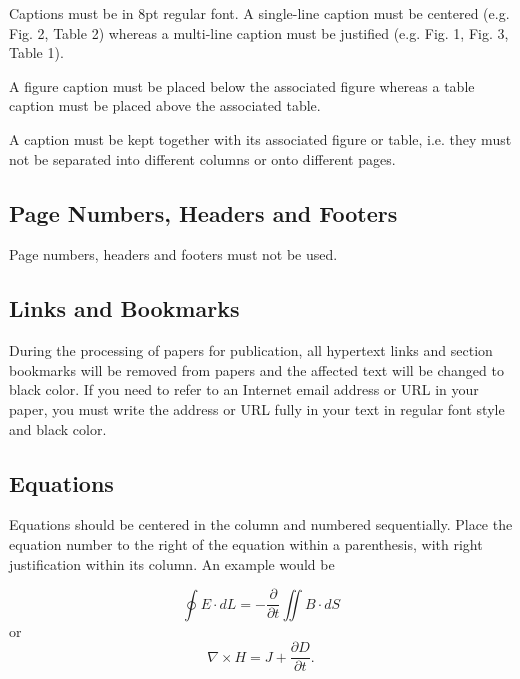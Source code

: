 \documentclass[conference,10pt,letterpaper]{IEEEtran}%
\begin{document}
Captions must be in 8pt regular font. A single-line caption must be
centered (e.g. Fig. 2, Table 2) whereas a multi-line caption must be
justified (e.g. Fig. 1, Fig. 3, Table 1).

A figure caption must be placed below the associated figure whereas a
table caption must be placed above the associated table.

A caption must be kept together with its associated figure or table,
i.e. they must not be separated into different columns or onto
different pages.


\subsection{Page Numbers, Headers and Footers}

Page numbers, headers and footers must not be used.


\subsection{Links and Bookmarks}

During the processing of papers for publication, all hypertext links
and section bookmarks will be removed from papers and the affected
text will be changed to black color. If you need to refer to an
Internet email address or URL in your paper, you must write the
address or URL fully in your text in regular font style and black
color. 


\subsection{Equations}

Equations should be centered in the column and numbered sequentially.
Place the equation number to the right of the equation within a parenthesis, with
right justification within its column. An example would be

\begin{equation}
\oint E \cdot dL = - \frac{\partial}{\partial t} \iint B \cdot dS
\end{equation}
or
\begin{equation}
\nabla \times H = J + \frac{\partial D}{\partial t}.
\end{equation}
\end{document}
